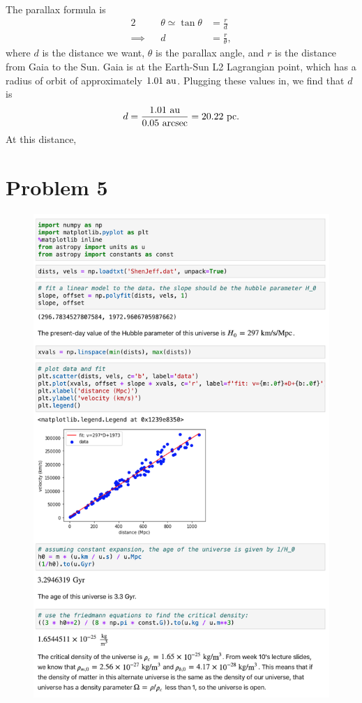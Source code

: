 \documentclass[11pt,letterpaper]{article}
\begin{document}
The parallax formula is 
\begin{alignat*}{2}
    &&\theta \simeq \tan{\theta} &= \frac{r}{d} \\
    \implies&& d &= \frac{r}{\theta},
\end{alignat*}
where $d$ is the distance we want, $\theta$ is the parallax angle, and $r$ is the distance from Gaia to the Sun. Gaia is at the Earth-Sun L2 Lagrangian point, which has a radius of orbit of approximately $1.01~{\rm au}$. Plugging these values in, we find that $d$ is 
\begin{align*}
    d = \frac{1.01~{\rm au}}{0.05~{\rm arcsec}} = 20.22~{\rm pc}.
\end{align*}
At this distance, 

\newpage

\section*{Problem 5}

\begin{figure}[!htbp]
    \centering
    \includegraphics[width=0.78\linewidth]{q5.png}
\end{figure}
\end{document}
